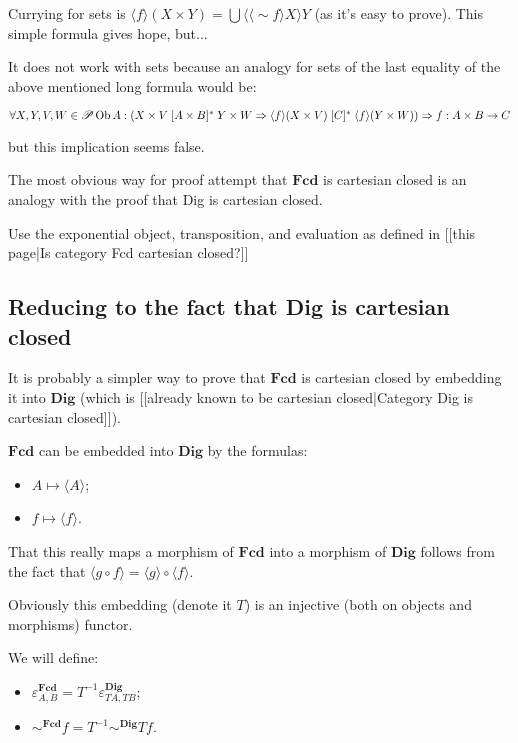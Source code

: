 Currying for sets is $\langle f \rangle ( X \times Y) = \bigcup \langle \langle \sim f \rangle X
\rangle Y$ (as it's easy to prove). This simple formula gives hope, but...

It does not work with sets because an analogy for sets of the last equality of the above mentioned long formula would be:

$\forall X, Y, V, W \in \mathscr{P} \operatorname{Ob} A : \left( X \times V \mathrel{[
A \times B]^{\ast}} Y \times W \Rightarrow \langle f \rangle ( X \times V)
\mathrel{[ C]^{\ast}} \langle f \rangle ( Y \times W) \right) \Rightarrow \\ f : A
\times B \rightarrow C$

but this implication seems false.

The most obvious way for proof attempt that $\mathbf{Fcd}$ is cartesian closed is an analogy with the proof that Dig is cartesian closed.

Use the exponential object, transposition, and evaluation as defined in [[this page|Is category Fcd cartesian closed?]]

\subsection{Reducing to the fact that Dig is cartesian closed}
It is probably a simpler way to prove that $\mathbf{Fcd}$ is cartesian closed by embedding it into $\mathbf{Dig}$ (which is [[already known to be cartesian closed|Category Dig is cartesian closed]]).

$\mathbf{Fcd}$ can be embedded into $\mathbf{Dig}$ by the formulas:
\begin{itemize}
\item $A \mapsto \langle A \rangle$;
\item $f \mapsto \langle f \rangle$.
\end{itemize}

That this really maps a morphism of $\mathbf{Fcd}$ into a morphism of $\mathbf{Dig}$ follows from the fact that $\langle g\circ f\rangle = \langle g\rangle\circ\langle f\rangle$.

Obviously this embedding (denote it $T$) is an injective (both on objects and morphisms) functor.

We will define:
\begin{itemize}
\item $\varepsilon^{\mathbf{Fcd}}_{A, B} = T^{-1} \varepsilon^{\mathbf{Dig}}_{T A, T B}$;
\item $\sim^{\mathbf{Fcd}} f = T^{-1} \sim^{\mathbf{Dig}} T f$.
\end{itemize}

